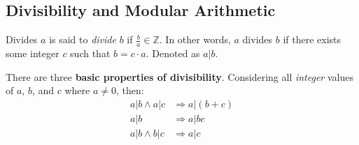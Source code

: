 \documentclass[12pt]{article}
\begin{document}
\subsection{Divisibility and Modular Arithmetic}
\label{ssec:divisibility}

\begin{definition}{Divides}
  $a$ is said to \textit{divide} $b$ if $\frac{b}{a} \in \mathbb{Z}$. In other words,
  $a$ divides $b$ if there exists some integer $c$ such that $b = c \cdot a$. Denoted as
  $a | b$.
\end{definition}
There are three \textbf{basic properties of divisibility}. Considering all \textit{integer} values of $a$,
$b$, and $c$ where $a \neq 0$, then:
\begin{align*}
  a|b \land a|c &\Rightarrow a|(b+c) \\
  a|b           &\Rightarrow a|bc \\
  a|b \land b|c &\Rightarrow a|c
\end{align*}
\end{document}

